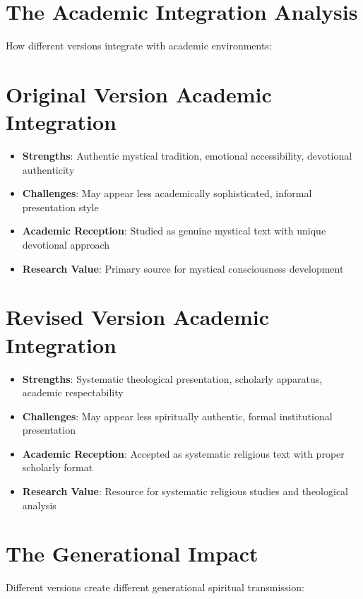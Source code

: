 \documentclass[11pt,twoside]{book}
\begin{document}
\section*{The Academic Integration Analysis}
\label{sec:org25e6f05}

How different versions integrate with academic environments:
\section*{Original Version Academic Integration}
\label{sec:org56a480d}
\begin{itemize}
\item \textbf{\textbf{Strengths}}: Authentic mystical tradition, emotional accessibility, devotional authenticity
\item \textbf{\textbf{Challenges}}: May appear less academically sophisticated, informal presentation style
\item \textbf{\textbf{Academic Reception}}: Studied as genuine mystical text with unique devotional approach
\item \textbf{\textbf{Research Value}}: Primary source for mystical consciousness development
\end{itemize}
\section*{Revised Version Academic Integration}
\label{sec:orgfa18015}
\begin{itemize}
\item \textbf{\textbf{Strengths}}: Systematic theological presentation, scholarly apparatus, academic respectability
\item \textbf{\textbf{Challenges}}: May appear less spiritually authentic, formal institutional presentation
\item \textbf{\textbf{Academic Reception}}: Accepted as systematic religious text with proper scholarly format
\item \textbf{\textbf{Research Value}}: Resource for systematic religious studies and theological analysis
\end{itemize}
\section*{The Generational Impact}
\label{sec:org83db68e}

Different versions create different generational spiritual transmission:
\end{document}
